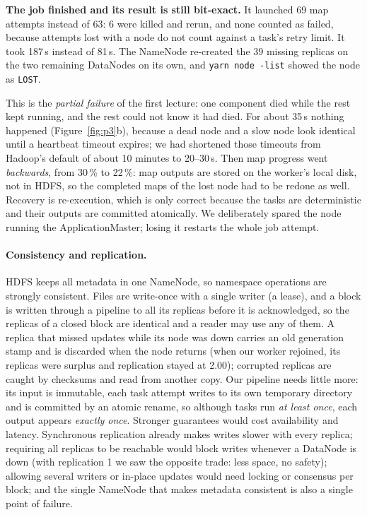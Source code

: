 \documentclass{zc-ust-hw}
\begin{document}
\textbf{The job finished and its result is still bit-exact.} It launched 69 map attempts
instead of 63: 6 were killed and rerun, and none counted as failed, because attempts lost with
a node do not count against a task's retry limit. It took 187\,s instead of 81\,s. The
NameNode re-created the 39 missing replicas on the two remaining DataNodes on its own, and
\texttt{yarn node -list} showed the node as \texttt{LOST}.

This is the \emph{partial failure} of the first lecture: one component died while the rest kept
running, and the rest could not know it had died. For about 35\,s nothing happened
(Figure~\ref{fig:p3}b), because a dead node and a slow node look identical until a heartbeat
timeout expires; we had shortened those timeouts from Hadoop's default of about 10 minutes to
20--30\,s. Then map progress went \emph{backwards}, from 30\,\% to 22\,\%: map outputs are
stored on the worker's local disk, not in HDFS, so the completed maps of the lost node had to
be redone as well. Recovery is re-execution, which is only correct because the tasks are
deterministic and their outputs are committed atomically. We deliberately spared the node
running the ApplicationMaster; losing it restarts the whole job attempt.

\paragraph{Consistency and replication.} HDFS keeps all metadata in one NameNode, so namespace
operations are strongly consistent. Files are write-once with a single writer (a lease), and a
block is written through a pipeline to all its replicas before it is acknowledged, so the
replicas of a closed block are identical and a reader may use any of them. A replica that
missed updates while its node was down carries an old generation stamp and is discarded when
the node returns (when our worker rejoined, its replicas were surplus and replication stayed at 2.00); corrupted replicas
are caught by checksums and read from another copy. Our pipeline needs little more: its input is
immutable, each task attempt writes to its own temporary directory and is committed by an atomic
rename, so although tasks run \emph{at least once}, each output appears \emph{exactly once}.
Stronger guarantees would cost availability and latency. Synchronous replication already makes
writes slower with every replica; requiring all replicas to be reachable would block writes
whenever a DataNode is down (with replication 1 we saw the opposite trade: less space, no
safety); allowing several writers or in-place updates would need locking or consensus per block;
and the single NameNode that makes metadata consistent is also a single point of failure.
\end{document}
